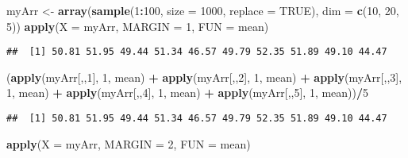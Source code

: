 \documentclass[]{book}
\newenvironment{Shaded}{\begin{snugshade}}{\end{snugshade}}
\newcommand{\KeywordTok}[1]{\textcolor[rgb]{0.13,0.29,0.53}{\textbf{#1}}}
\newcommand{\DataTypeTok}[1]{\textcolor[rgb]{0.13,0.29,0.53}{#1}}
\newcommand{\DecValTok}[1]{\textcolor[rgb]{0.00,0.00,0.81}{#1}}
\newcommand{\StringTok}[1]{\textcolor[rgb]{0.31,0.60,0.02}{#1}}
\newcommand{\OtherTok}[1]{\textcolor[rgb]{0.56,0.35,0.01}{#1}}
\newcommand{\OperatorTok}[1]{\textcolor[rgb]{0.81,0.36,0.00}{\textbf{#1}}}
\newcommand{\NormalTok}[1]{#1}
\theoremstyle{definition}
\theoremstyle{definition}
\theoremstyle{definition}
\theoremstyle{remark}
\begin{document}
\begin{Shaded}
\begin{Highlighting}[]
\NormalTok{myArr <-}\StringTok{ }\KeywordTok{array}\NormalTok{(}\KeywordTok{sample}\NormalTok{(}\DecValTok{1}\OperatorTok{:}\DecValTok{100}\NormalTok{, }\DataTypeTok{size =} \DecValTok{1000}\NormalTok{, }\DataTypeTok{replace =} \OtherTok{TRUE}\NormalTok{), }\DataTypeTok{dim =} \KeywordTok{c}\NormalTok{(}\DecValTok{10}\NormalTok{, }\DecValTok{20}\NormalTok{, }\DecValTok{5}\NormalTok{))}
\KeywordTok{apply}\NormalTok{(}\DataTypeTok{X =}\NormalTok{ myArr, }\DataTypeTok{MARGIN =} \DecValTok{1}\NormalTok{, }\DataTypeTok{FUN =}\NormalTok{ mean)}
\end{Highlighting}
\end{Shaded}

\begin{verbatim}
##  [1] 50.81 51.95 49.44 51.34 46.57 49.79 52.35 51.89 49.10 44.47
\end{verbatim}

\begin{Shaded}
\begin{Highlighting}[]
\NormalTok{(}\KeywordTok{apply}\NormalTok{(myArr[,,}\DecValTok{1}\NormalTok{], }\DecValTok{1}\NormalTok{, mean) }\OperatorTok{+}\StringTok{ }\KeywordTok{apply}\NormalTok{(myArr[,,}\DecValTok{2}\NormalTok{], }\DecValTok{1}\NormalTok{, mean) }\OperatorTok{+}\StringTok{ }
\StringTok{  }\KeywordTok{apply}\NormalTok{(myArr[,,}\DecValTok{3}\NormalTok{], }\DecValTok{1}\NormalTok{, mean) }\OperatorTok{+}\StringTok{ }\KeywordTok{apply}\NormalTok{(myArr[,,}\DecValTok{4}\NormalTok{], }\DecValTok{1}\NormalTok{, mean) }\OperatorTok{+}\StringTok{ }
\StringTok{  }\KeywordTok{apply}\NormalTok{(myArr[,,}\DecValTok{5}\NormalTok{], }\DecValTok{1}\NormalTok{, mean))}\OperatorTok{/}\DecValTok{5}
\end{Highlighting}
\end{Shaded}

\begin{verbatim}
##  [1] 50.81 51.95 49.44 51.34 46.57 49.79 52.35 51.89 49.10 44.47
\end{verbatim}

\begin{Shaded}
\begin{Highlighting}[]
\KeywordTok{apply}\NormalTok{(}\DataTypeTok{X =}\NormalTok{ myArr, }\DataTypeTok{MARGIN =} \DecValTok{2}\NormalTok{, }\DataTypeTok{FUN =}\NormalTok{ mean)}
\end{Highlighting}
\end{Shaded}
\end{document}

